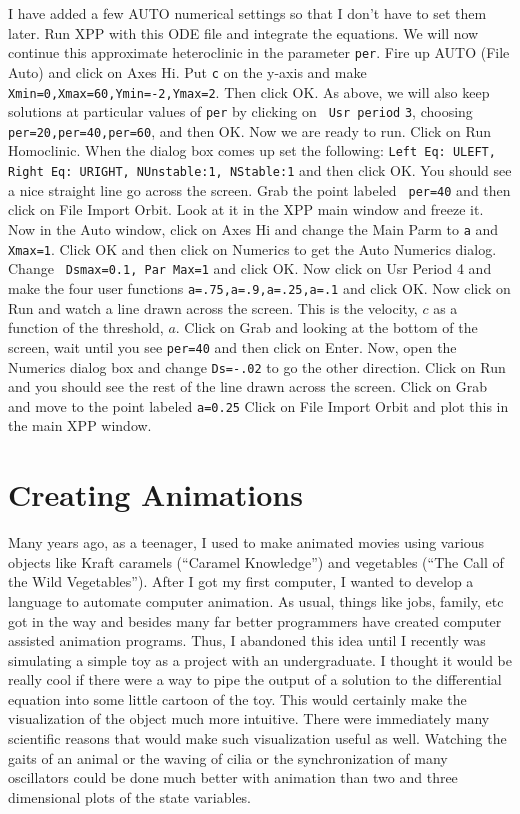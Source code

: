 \documentclass{article}
\begin{document}
I have added a few AUTO numerical settings so that I don't have to set
them later.  Run XPP with this ODE file and integrate the
equations. We will now continue this approximate heteroclinic in the
parameter {\tt per}. Fire up AUTO (File Auto) and click on Axes
Hi. Put {\tt c} on the y-axis and make {\tt
Xmin=0,Xmax=60,Ymin=-2,Ymax=2}. Then click OK.  As above, we will also
keep solutions at particular values of {\tt per} by clicking on {\tt
Usr period} {\tt 3}, choosing {\tt per=20,per=40,per=60}, and then OK.
Now we are ready to run. Click on Run Homoclinic. When the dialog box
comes up set the following: {\tt Left Eq: ULEFT, Right Eq: URIGHT,
NUnstable:1, NStable:1}  and then click OK.   You should see a nice
straight line go across the screen. Grab the point labeled {\tt
per=40} and then click on File Import Orbit. Look at it in the XPP
main window and freeze it.  Now in the Auto window, click on Axes Hi
and change the Main Parm to {\tt a} and {\tt Xmax=1}.  Click OK and
then click on Numerics to get the Auto Numerics dialog. Change {\tt
Dsmax=0.1, Par Max=1} and click OK. Now click on Usr Period 4 and make
the four user functions {\tt a=.75,a=.9,a=.25,a=.1} and click OK.  Now
click on Run and watch a line drawn across the screen. This is the
velocity, $c$ as a function of the threshold, $a$. Click on Grab and
looking at the bottom of the screen, wait until you see {\tt per=40}
and then click on Enter.  Now, open the Numerics dialog box and change
{\tt Ds=-.02} to go the other direction.  Click on Run and you should
see the rest of the line drawn across the screen. Click on Grab and
move to the point labeled {\tt a=0.25}  Click on File Import Orbit and
plot this in the main XPP window.


\section{Creating Animations}
\label{toon}
Many years ago, as a teenager, I used to make animated movies using
various objects like Kraft caramels (``Caramel Knowledge'') and
vegetables (``The Call of the Wild Vegetables'').  After I got my
first computer, I wanted to develop a language to automate computer
animation. As usual, things like jobs, family, etc got in the way and
besides many far better programmers have created computer assisted
animation programs.  Thus, I abandoned this idea until I recently was
simulating a simple toy as a project with an undergraduate.  I thought
it would be really cool if there were a way to pipe the output of a
solution to the differential equation into some little cartoon of the
toy. This would certainly make the visualization of the object much
more intuitive. There were immediately many scientific reasons that
would make such visualization useful as well. Watching the gaits of an
animal or the waving of cilia or the synchronization of many
oscillators could be done much better with animation
than two and three dimensional plots of the state variables.
\end{document}
